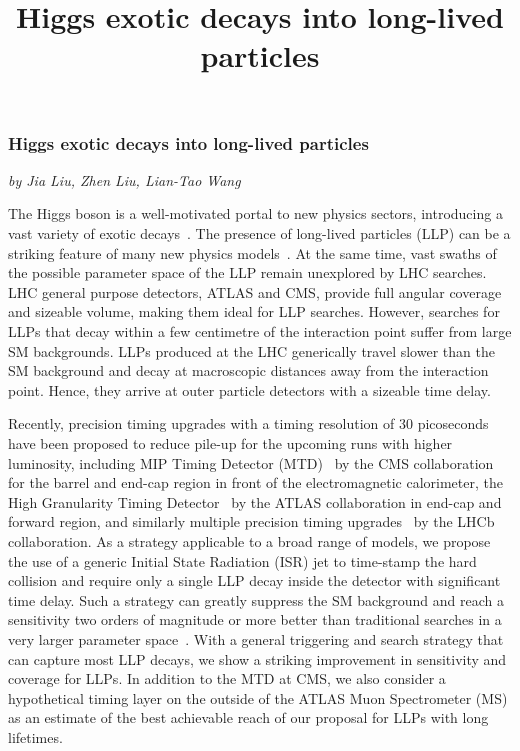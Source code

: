 \title{
Higgs exotic decays into long-lived particles
}



\subsubsection{Higgs exotic decays into long-lived particles}\label{Sec:9.1.2}
\begin{center}{\it by Jia Liu, Zhen Liu, Lian-Tao Wang}
\end{center}


The Higgs boson is a well-motivated portal to new physics sectors, introducing a vast variety of exotic decays~\cite{Curtin:2013fra}.
The presence of long-lived particles (LLP) can be a striking feature of many new physics models~\cite{Liu:2018wte,Barbier:2004ez,Giudice:1998bp,Meade:2010ji,Arvanitaki:2012ps,ArkaniHamed:2012gw,Liu:2015bma,Chacko:2005pe, Burdman:2006tz,Kang:2008ea,Craig:2015pha, Davoli:2017swj}. 
At the same time, vast swaths of the possible parameter space of the LLP remain unexplored by LHC searches.
LHC general purpose detectors, ATLAS and CMS, provide full angular coverage and sizeable volume, making them ideal for LLP searches.
However, searches for LLPs that decay within a few centimetre of the interaction point suffer from large SM backgrounds. 
LLPs produced at the LHC generically travel slower than the SM background and decay at macroscopic distances away from the interaction point. Hence, they arrive at outer particle detectors with a sizeable time delay. 

Recently, precision timing upgrades with a timing resolution of 30 picoseconds have been proposed to reduce pile-up for the upcoming 
runs with higher luminosity, including MIP Timing Detector (MTD)~\cite{Collaboration:2296612}  by the CMS collaboration for 
the barrel and end-cap region in front of the electromagnetic calorimeter, the High Granularity Timing Detector~\cite{Allaire:2018bof} 
by the ATLAS collaboration in end-cap and forward region,  and similarly multiple precision timing upgrades~\cite{Bediaga:2018lhg} by the 
LHCb collaboration.
As a strategy applicable to a broad range of models, we propose the use of a generic Initial State Radiation (ISR) jet to time-stamp the hard collision and require only a single LLP decay inside the detector with significant time delay. Such a strategy can greatly suppress the SM background and 
reach a sensitivity two orders of magnitude or more better than traditional searches in a very larger parameter space~\cite{Aad:2015uaa, CMS:2014wda,Coccaro:2016lnz, Liu:2015bma}. 
With a general triggering and search strategy that can capture most LLP decays, 
we show a striking improvement in sensitivity and coverage for LLPs. In addition to the MTD at CMS, we also consider a hypothetical timing layer on the outside of the ATLAS Muon Spectrometer (MS) as an estimate of the best achievable reach of our proposal for LLPs with long lifetimes.  \\

